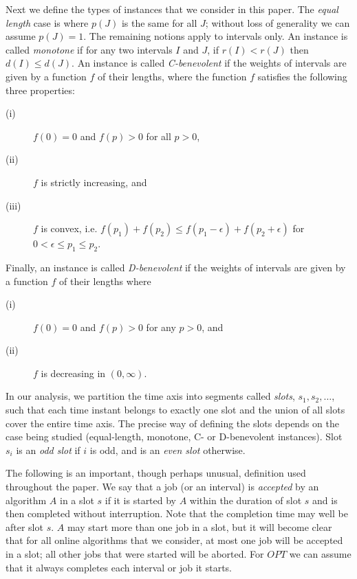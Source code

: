 \documentclass[11pt]{article}
\begin{document}
Next we define the types of instances that we consider in this paper.
The {\it equal length} case is where $p(J)$ is the same for all $J$;
without loss of generality we can assume $p(J)=1$.
The remaining notions apply to intervals only.
An instance is called {\it monotone} if for any two intervals $I$ and
$J$, if $r(I) < r(J)$ then $d(I) \leq d(J)$.  
An instance is called {\it C-benevolent} if the weights of intervals are
given by a function $f$ of their lengths, where the function $f$ satisfies
the following three properties: 
\begin{description}
\item[(i)]
$f(0)=0$ and $f(p)>0$ for all $p>0$, 
\item[(ii)]
$f$ is strictly increasing, and 
\item[(iii)]
$f$ is convex,
i.e.  $f(p_1)+f(p_2) \le f(p_1-\epsilon)+f(p_2+\epsilon)$ for 
$0 < \epsilon \le p_1 \le p_2$.
\end{description}
Finally, an instance is called {\it D-benevolent} if the weights of 
intervals are given by a function $f$ of their lengths where
\begin{description}
\item[(i)]
$f(0)=0$ and $f(p)>0$ for any $p>0$, and
\item[(ii)]
$f$ is decreasing in $(0, \infty)$.
\end{description}

In our analysis, we partition the time axis into segments called
{\it slots}, $s_1, s_2, \ldots$,
such that each time instant belongs to exactly one slot
and the union of all slots cover the entire time axis.
The precise way of defining the slots depends on the case being studied 
(equal-length, monotone, C- or D-benevolent instances).
Slot $s_i$ is an {\it odd slot} if $i$ is odd, and is an
{\it even slot} otherwise.  

The following is an important, though perhaps unusual, definition 
used throughout the paper.
We say that a job (or an interval) is {\it accepted} by an algorithm $A$ 
in a slot $s$
if it is started by $A$ within the duration of slot $s$ and is then 
completed without interruption.  
Note that the completion time may well be after slot $s$.
$A$ may start more than one job in a slot,
but it will become clear that for all online algorithms that we consider,
at most one job will be accepted in a slot; all other jobs that were started
will be aborted.
For $OPT$ we can assume that it always completes each
interval or job it starts.
\end{document}
